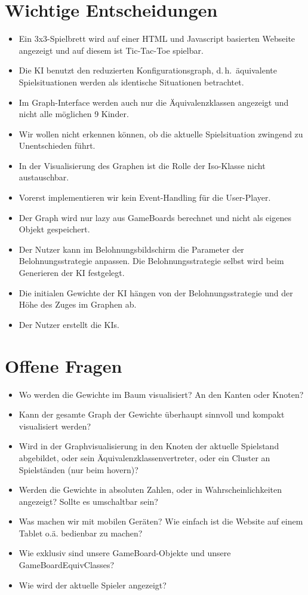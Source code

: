 \documentclass[titlepage]{scrartcl}
\begin{document}
\section{Wichtige Entscheidungen}
\begin{itemize}
	\item Ein 3x3-Spielbrett wird auf einer HTML und Javascript basierten Webseite angezeigt und auf diesem ist Tic-Tac-Toe spielbar.
	\item Die KI benutzt den reduzierten Konfigurationsgraph, d.\,h.\ äquivalente Spielsituationen werden als identische Situationen betrachtet.
	\item Im Graph-Interface werden auch nur die Äquivalenzklassen angezeigt und nicht alle möglichen 9 Kinder.
	\item Wir wollen nicht erkennen können, ob die aktuelle Spielsituation zwingend zu Unentschieden führt.
	\item In der Visualisierung des Graphen ist die Rolle der Iso-Klasse nicht austauschbar.
	\item Vorerst implementieren wir kein Event-Handling für die User-Player.
	\item Der Graph wird nur lazy aus GameBoards berechnet und nicht als eigenes Objekt gespeichert.
	\item Der Nutzer kann im Belohnungsbildschirm die Parameter der Belohnungsstrategie anpassen. Die Belohnungsstrategie selbst wird beim Generieren der KI festgelegt.
	\item Die initialen Gewichte der KI hängen von der Belohnungsstrategie und der Höhe des Zuges im Graphen ab.
	\item Der Nutzer erstellt die KIs.
\end{itemize}

\section{Offene Fragen}
\begin{itemize}
	\item Wo werden die Gewichte im Baum visualisiert? An den Kanten oder Knoten?
	\item Kann der gesamte Graph der Gewichte überhaupt sinnvoll und kompakt visualisiert werden?
	\item Wird in der Graphvisualisierung in den Knoten der aktuelle Spielstand abgebildet, oder sein Äquivalenzklassenvertreter, oder ein Cluster an Spielständen (nur beim hovern)?
	\item Werden die Gewichte in absoluten Zahlen, oder in Wahrscheinlichkeiten angezeigt? Sollte es umschaltbar sein?
	\item Was machen wir mit mobilen Geräten? Wie einfach ist die Website auf einem Tablet o.ä. bedienbar zu machen?
	\item Wie exklusiv sind unsere GameBoard-Objekte und unsere GameBoardEquivClasses?
	\item Wie wird der aktuelle Spieler angezeigt?
\end{itemize}
\end{document}
